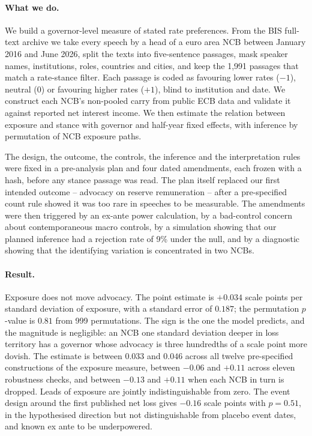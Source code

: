 \documentclass[11pt]{article}
\theoremstyle{plain}
\begin{document}
\paragraph{What we do.} We build a governor-level measure of stated rate preferences. From the BIS full-text archive we take every speech by a head of a euro area NCB between January 2016 and June 2026, split the texts into five-sentence passages, mask speaker names, institutions, roles, countries and cities, and keep the 1{,}991 passages that match a rate-stance filter. Each passage is coded as favouring lower rates ($-1$), neutral ($0$) or favouring higher rates ($+1$), blind to institution and date. We construct each NCB's non-pooled carry from public ECB data and validate it against reported net interest income. We then estimate the relation between exposure and stance with governor and half-year fixed effects, with inference by permutation of NCB exposure paths.

The design, the outcome, the controls, the inference and the interpretation rules were fixed in a pre-analysis plan and four dated amendments, each frozen with a hash, before any stance passage was read. The plan itself replaced our first intended outcome -- advocacy on reserve remuneration -- after a pre-specified count rule showed it was too rare in speeches to be measurable. The amendments were then triggered by an ex-ante power calculation, by a bad-control concern about contemporaneous macro controls, by a simulation showing that our planned inference had a rejection rate of 9\% under the null, and by a diagnostic showing that the identifying variation is concentrated in two NCBs.

\paragraph{Result.} Exposure does not move advocacy. The point estimate is $+0.034$ scale points per standard deviation of exposure, with a standard error of $0.187$; the permutation $p$-value is $0.81$ from 999 permutations. The sign is the one the model predicts, and the magnitude is negligible: an NCB one standard deviation deeper in loss territory has a governor whose advocacy is three hundredths of a scale point more dovish. The estimate is between $0.033$ and $0.046$ across all twelve pre-specified constructions of the exposure measure, between $-0.06$ and $+0.11$ across eleven robustness checks, and between $-0.13$ and $+0.11$ when each NCB in turn is dropped. Leads of exposure are jointly indistinguishable from zero. The event design around the first published net loss gives $-0.16$ scale points with $p=0.51$, in the hypothesised direction but not distinguishable from placebo event dates, and known ex ante to be underpowered.
\end{document}
